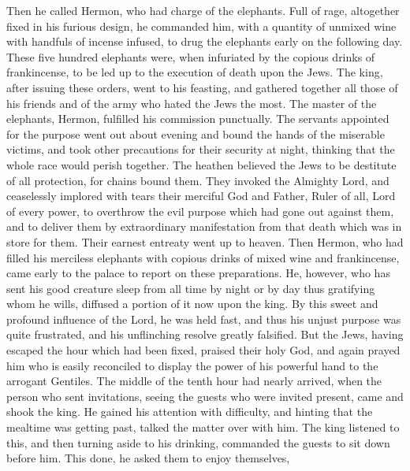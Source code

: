  Then he called Hermon, who had charge of the elephants.
Full of rage, altogether fixed in his furious design,  he
commanded him, with a quantity of unmixed wine with handfuls of incense
infused, to drug the elephants early on the following day. These five
hundred elephants were, when infuriated by the copious drinks of
frankincense, to be led up to the execution of death upon the Jews.
 The king, after issuing these orders, went to his feasting,
and gathered together all those of his friends and of the army who hated
the Jews the most.  The master of the elephants, Hermon,
fulfilled his commission punctually.  The servants appointed
for the purpose went out about evening and bound the hands of the
miserable victims, and took other precautions for their security at
night, thinking that the whole race would perish together. 
The heathen believed the Jews to be destitute of all protection, for
chains bound them.  They invoked the Almighty Lord, and
ceaselessly implored with tears their merciful God and Father, Ruler of
all, Lord of every power,  to overthrow the evil purpose
which had gone out against them, and to deliver them by extraordinary
manifestation from that death which was in store for them. 
Their earnest entreaty went up to heaven.  Then Hermon, who
had filled his merciless elephants with copious drinks of mixed wine and
frankincense, came early to the palace to report on these preparations.
 He, however, who has sent his good creature sleep from all
time by night or by day thus gratifying whom he wills, diffused a
portion of it now upon the king.  By this sweet and
profound influence of the Lord, he was held fast, and thus his unjust
purpose was quite frustrated, and his unflinching resolve greatly
falsified.  But the Jews, having escaped the hour which had
been fixed, praised their holy God, and again prayed him who is easily
reconciled to display the power of his powerful hand to the arrogant
Gentiles.  The middle of the tenth hour had nearly arrived,
when the person who sent invitations, seeing the guests who were invited
present, came and shook the king.  He gained his attention
with difficulty, and hinting that the mealtime was getting past, talked
the matter over with him.  The king listened to this, and
then turning aside to his drinking, commanded the guests to sit down
before him.  This done, he asked them to enjoy themselves,
